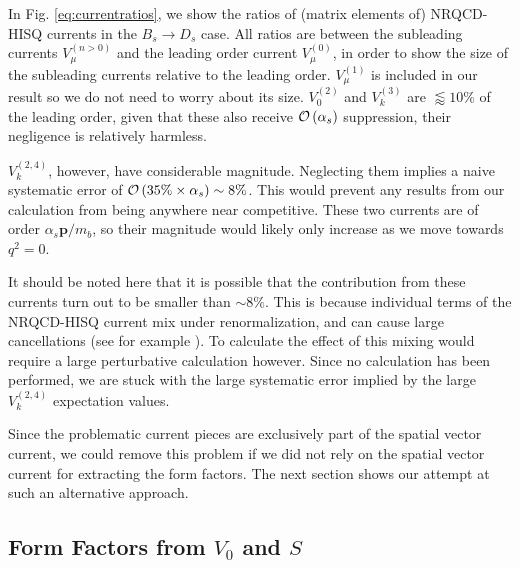 In Fig. \ref{eq:currentratios}, we show the ratios of (matrix elements of) NRQCD-HISQ currents in the $B_s\to D_s$ case. All ratios are between the subleading currents $V_{\mu}^{(n>0)}$ and the leading order current $V_{\mu}^{(0)}$, in order to show the size of the subleading currents relative to the leading order. $V^{(1)}_{\mu}$ is included in our result so we do not need to worry about its size. $V_0^{(2)}$ and $V_k^{(3)}$ are $\lessapprox 10\%$ of the leading order, given that these also receive $\mathcal{O}\left( \alpha_s \right)$ suppression, their negligence is relatively harmless.

$V_k^{(2,4)}$, however, have considerable magnitude. Neglecting them implies a naive systematic error of $\mathcal{O}\left(  35\% \times \alpha_s  \right) \sim 8\%$. This would prevent any results from our calculation from being anywhere near competitive. These two currents are of order $\alpha_s{\textbf{p}}/m_b$, so their magnitude would likely only increase as we move towards $q^2=0$.

It should be noted here that it is possible that the contribution from these currents turn out to be smaller than $\sim 8\%$. This is because individual terms of the NRQCD-HISQ current mix under renormalization, and can cause large cancellations (see for example \cite{Monahan:2012dq}). To calculate the effect of this mixing would require a large perturbative calculation however. Since no calculation has been performed, we are stuck with the large systematic error implied by the large $V_k^{(2,4)}$ expectation values.

Since the problematic current pieces are exclusively part of the spatial vector current, we could remove this problem if we did not rely on the spatial vector current for extracting the form factors. The next section shows our attempt at such an alternative approach.

\subsection{Form Factors from $V_0$ and $S$}
\label{sec:fplus_divergence}

